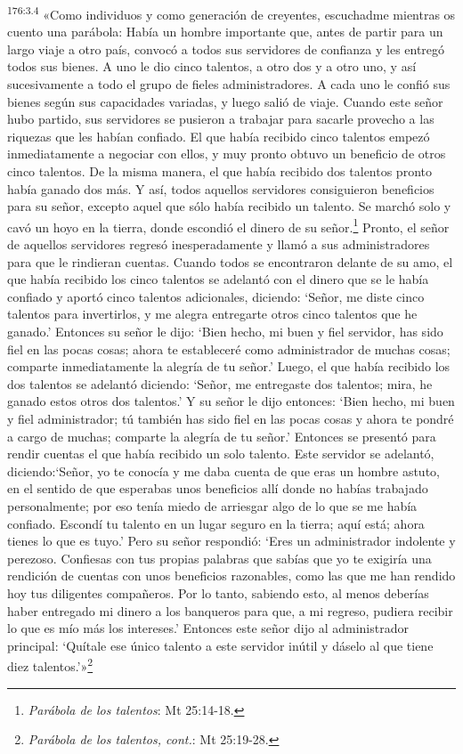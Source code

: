 \par
\textsuperscript{176:3.4} «Como individuos y como generación de creyentes, escuchadme mientras os cuento una parábola: Había un hombre importante que, antes de partir para un largo viaje a otro país, convocó a todos sus servidores de confianza y les entregó todos sus bienes. A uno le dio cinco talentos, a otro dos y a otro uno, y así sucesivamente a todo el grupo de fieles administradores. A cada uno le confió sus bienes según sus capacidades variadas, y luego salió de viaje. Cuando este señor hubo partido, sus servidores se pusieron a trabajar para sacarle provecho a las riquezas que les habían confiado. El que había recibido cinco talentos empezó inmediatamente a negociar con ellos, y muy pronto obtuvo un beneficio de otros cinco talentos. De la misma manera, el que había recibido dos talentos pronto había ganado dos más. Y así, todos aquellos servidores consiguieron beneficios para su señor, excepto aquel que sólo había recibido un talento. Se marchó solo y cavó un hoyo en la tierra, donde escondió el dinero de su señor.\footnote{\textit{Parábola de los talentos}: Mt 25:14-18.} Pronto, el señor de aquellos servidores regresó inesperadamente y llamó a sus administradores para que le rindieran cuentas. Cuando todos se encontraron delante de su amo, el que había recibido los cinco talentos se adelantó con el dinero que se le había confiado y aportó cinco talentos adicionales, diciendo: `Señor, me diste cinco talentos para invertirlos, y me alegra entregarte otros cinco talentos que he ganado.' Entonces su señor le dijo: `Bien hecho, mi buen y fiel servidor, has sido fiel en las pocas cosas; ahora te estableceré como administrador de muchas cosas; comparte inmediatamente la alegría de tu señor.' Luego, el que había recibido los dos talentos se adelantó diciendo: `Señor, me entregaste dos talentos; mira, he ganado estos otros dos talentos.' Y su señor le dijo entonces: `Bien hecho, mi buen y fiel administrador; tú también has sido fiel en las pocas cosas y ahora te pondré a cargo de muchas; comparte la alegría de tu señor.' Entonces se presentó para rendir cuentas el que había recibido un solo talento. Este servidor se adelantó, diciendo:`Señor, yo te conocía y me daba cuenta de que eras un hombre astuto, en el sentido de que esperabas unos beneficios allí donde no habías trabajado personalmente; por eso tenía miedo de arriesgar algo de lo que se me había confiado. Escondí tu talento en un lugar seguro en la tierra; aquí está; ahora tienes lo que es tuyo.' Pero su señor respondió: `Eres un administrador indolente y perezoso. Confiesas con tus propias palabras que sabías que yo te exigiría una rendición de cuentas con unos beneficios razonables, como las que me han rendido hoy tus diligentes compañeros. Por lo tanto, sabiendo esto, al menos deberías haber entregado mi dinero a los banqueros para que, a mi regreso, pudiera recibir lo que es mío más los intereses.' Entonces este señor dijo al administrador principal: `Quítale ese único talento a este servidor inútil y dáselo al que tiene diez talentos.'»\footnote{\textit{Parábola de los talentos, cont.}: Mt 25:19-28.}

